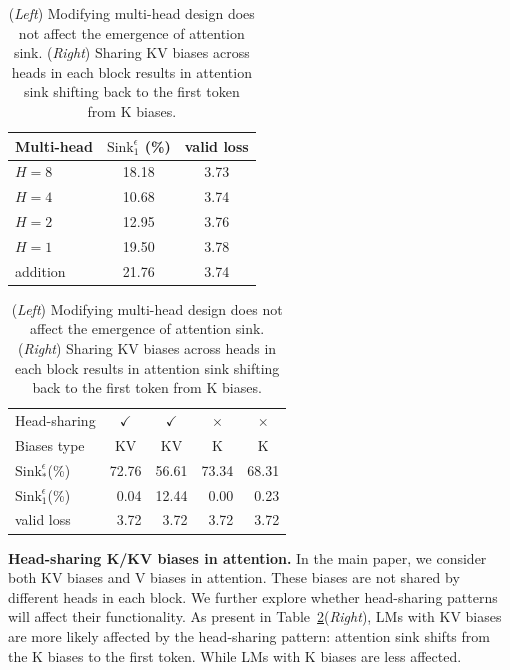 \documentclass{article} \usepackage{iclr2025_conference,times}
\begin{document}
\begin{table}[htbp]
\caption{(\emph{Left}) Modifying multi-head design does not affect the emergence of attention sink. (\emph{Right}) Sharing KV biases across heads in each block results in attention sink shifting back to the first token from K biases.}
\begin{minipage}[t]{0.4\linewidth}
\begin{center}
\begin{tabular}[t]{l|cc}
\toprule
Multi-head & $\textrm{Sink}_1^{\epsilon}$ (\%) & valid loss \\
\midrule
$H=\textrm{8}$ & 18.18 & 3.73\\
$H=\textrm{4}$ & 10.68 & 3.74\\
$H=\textrm{2}$ & 12.95 & 3.76\\
$H=\textrm{1}$ & 19.50 & 3.78\\
addition & 21.76 & 3.74\\
\bottomrule
\end{tabular}
\end{center}
\end{minipage}
\hfill
\begin{minipage}[t]{0.58\linewidth}
\begin{center}
\begin{tabular}[t]{l|cccc}
\toprule
Head-sharing & $\checkmark$ & $\checkmark$  & $\times$ & $\times$ \\
Biases type & KV & KV & K & K \\
\midrule
$\textrm{Sink}_{*}^{\epsilon}$(\%)  & 72.76 & 56.61 & 73.34 & 68.31  \\
$\textrm{Sink}_1^{\epsilon}$(\%) &   \,\,\,0.04 & 12.44 & \,\,\,0.00 & \,\,\,0.23 \\
valid loss & \,\,\,3.72 & \,\,\,3.72 & \,\,\,3.72 & \,\,\,3.72\\
\bottomrule
\end{tabular}
\end{center}
\end{minipage}
\label{multi_head}
\end{table}






\textbf{Head-sharing K/KV biases in attention.} In the main paper, we consider both KV biases and V biases in attention. These biases are not shared by different heads in each block. We further explore whether head-sharing patterns will affect their functionality. As present in Table~\ref{multi_head}(\emph{Right}), LMs with KV biases are more likely affected by the head-sharing pattern: attention sink shifts from the K biases to the first token. While LMs with K biases are less affected. 
\end{document}
